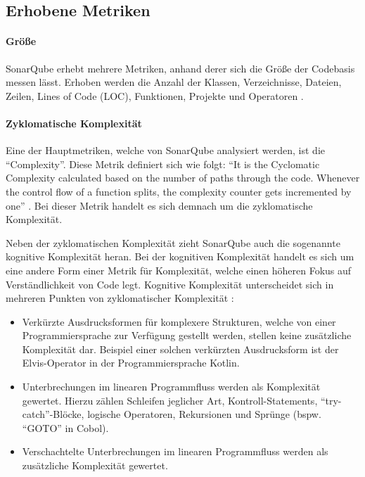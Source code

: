 \documentclass[a4paper, 12pt]{article}
\begin{document}
\subsection{Erhobene Metriken}

\paragraph{Größe}
SonarQube erhebt mehrere Metriken, anhand derer sich die Größe der Codebasis messen lässt.
Erhoben werden die Anzahl der Klassen, Verzeichnisse, Dateien, Zeilen, Lines of Code (LOC), Funktionen, Projekte und Operatoren \parencite{sonarqube_metric_definitions}.

\paragraph{Zyklomatische Komplexität}
Eine der Hauptmetriken, welche von SonarQube analysiert werden, ist die \enquote{Complexity}.
Diese Metrik definiert sich wie folgt: \enquote{It is the Cyclomatic Complexity calculated based on the number of paths through the code. Whenever the control flow of a function splits, the complexity counter gets incremented by one} \parencite{sonarqube_metric_definitions}.
Bei dieser Metrik handelt es sich demnach um die zyklomatische Komplexität.

Neben der zyklomatischen Komplexität zieht SonarQube auch die sogenannte kognitive Komplexität heran.
Bei der kognitiven Komplexität handelt es sich um eine andere Form einer Metrik für Komplexität, welche einen höheren Fokus auf Verständlichkeit von Code legt.
Kognitive Komplexität unterscheidet sich in mehreren Punkten von zyklomatischer Komplexität \parencite{Cognitive_Complexity}:
\begin{itemize}
    \item Verkürzte Ausdrucksformen für komplexere Strukturen, welche von einer Programmiersprache zur Verfügung gestellt werden, stellen keine zusätzliche Komplexität dar. Beispiel einer solchen verkürzten Ausdrucksform ist der Elvis-Operator in der Programmiersprache Kotlin.
    \item Unterbrechungen im linearen Programmfluss werden als Komplexität gewertet. Hierzu zählen Schleifen jeglicher Art, Kontroll-Statements, \enquote{try-catch}-Blöcke, logische Operatoren, Rekursionen und Sprünge (bspw. \enquote{GOTO} in Cobol).
    \item Verschachtelte Unterbrechungen im linearen Programmfluss werden als zusätzliche Komplexität gewertet.
\end{itemize}
\end{document}
